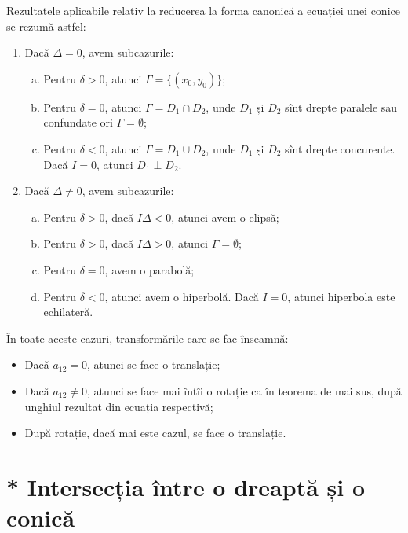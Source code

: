 Rezultatele aplicabile relativ la reducerea la forma canonică a ecuației unei
conice se rezumă astfel:

\begin{enumerate}[(1)]
	\item Dacă $\Delta = 0$, avem subcazurile:
	    \begin{enumerate}[(a)]
	        \item Pentru $\delta > 0$, atunci $\Gamma = \{(x_0, y_0)\}$;
	        \item Pentru $\delta = 0$, atunci $\Gamma = D_1 \cap D_2$, unde 
$D_1$ și $D_2$ sînt drepte paralele sau confundate ori $\Gamma = \emptyset$;
            \item Pentru $\delta < 0$, atunci $\Gamma = D_1 \cup D_2$, unde 
$D_1$ și $D_2$ sînt drepte concurente. Dacă $I = 0 $, atunci $D_1 \perp D_2$.
        \end{enumerate}
    \item Dacă $\Delta \neq 0$, avem subcazurile:
        \begin{enumerate}[(a)]
	        \item Pentru $\delta > 0$, dacă $I\Delta < 0$, atunci avem o elipsă;
	        \item Pentru $\delta > 0$, dacă $I\Delta > 0$, atunci 
$\Gamma = \emptyset$;
            \item Pentru $\delta = 0$, avem o parabolă;
            \item Pentru $\delta < 0$, atunci avem o hiperbolă. Dacă $I = 0$,
atunci hiperbola este echilateră.
        \end{enumerate}
\end{enumerate}

În toate aceste cazuri, transformările care se fac înseamnă:
\begin{itemize}
	\item Dacă $a_{12} = 0$, atunci se face o translație;
	\item Dacă $a_{12} \neq 0$, atunci se face mai întîi o rotație ca în teorema
de mai sus, după unghiul rezultat din ecuația respectivă;
    \item După rotație, dacă mai este cazul, se face o translație.
\end{itemize}


\section{* Intersecția între o dreaptă și o conică}

